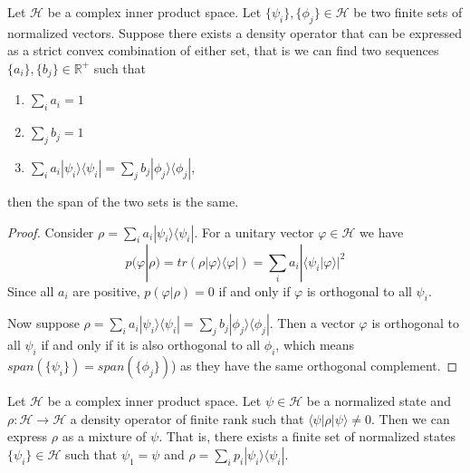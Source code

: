 \documentclass[10pt,twocolumn, nofootinbib]{revtex4-2}
\def\>{\rangle}
\def\<{\langle}
\begin{document}
\begin{prop}\label{prop_densitySpan}
	Let $\mathcal{H}$ be a complex inner product space. Let $\{\psi_i\}, \{\phi_j\} \in \mathcal{H}$ be two finite sets of normalized vectors. Suppose there exists a density operator that can be expressed as a strict convex combination of either set, that is we can find two sequences $\{a_i\}, \{b_j\} \in \mathbb{R}^+$ such that
	\begin{enumerate}
		\item $\sum_i a_i = 1$
		\item $\sum_j b_j = 1$
		\item $\sum_i a_i |\psi_i\>\<\psi_i| = \sum_j b_j |\phi_j\>\<\phi_j|$,
	\end{enumerate}
	then the span of the two sets is the same.
\end{prop}

\begin{proof}
	Consider $\rho = \sum_i a_i |\psi_i\>\<\psi_i|$. For a unitary vector $\varphi \in \mathcal{H}$ we have
	$$p(\varphi|\rho)=tr(\rho |\varphi\>\<\varphi|) =  \sum_i a_i |\<\psi_i|\varphi\>|^2$$
	Since all $a_i$ are positive, $p(\varphi|\rho) = 0$ if and only if $\varphi$ is orthogonal to all $\psi_i$.
	
	Now suppose $\rho = \sum_i a_i |\psi_i\>\<\psi_i| = \sum_j b_j |\phi_j\>\<\phi_j|$. Then a vector $\varphi$ is orthogonal to all $\psi_i$ if and only if it is also orthogonal to all $\phi_i$, which means $span(\{\psi_i\}) = span(\{\phi_j\})$) as they have the same orthogonal complement.
\end{proof}

\begin{prop}\label{prop_decomposition}
	Let $\mathcal{H}$ be a complex inner product space. Let $\psi \in \mathcal{H}$ be a normalized state and $\rho : \mathcal{H} \to \mathcal{H}$ a density operator of finite rank such that $\<\psi|\rho|\psi\>\neq 0$. Then we can express $\rho$ as a mixture of $\psi$. That is, there exists a finite set of normalized states $\{\psi_i\} \in \mathcal{H}$ such that $\psi_1 = \psi$ and $\rho = \sum_i p_i |\psi_i\>\<\psi_i|$.
\end{prop}
\end{document}
